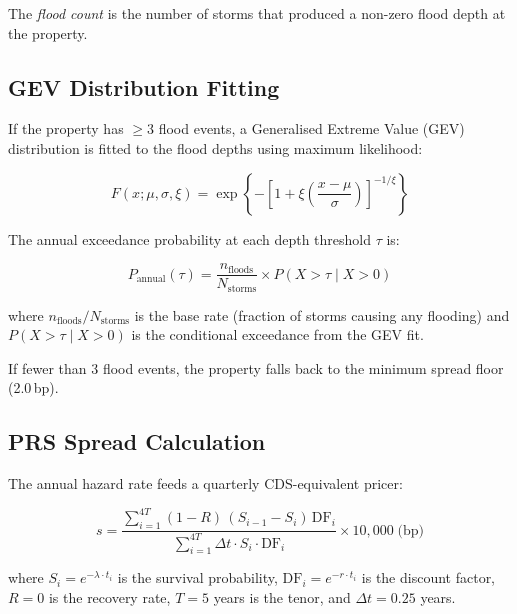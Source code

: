 \documentclass[11pt,a4paper]{article}
\begin{document}
\noindent The \emph{flood count} is the number of storms that produced a non-zero flood
depth at the property.

\subsection{GEV Distribution Fitting}

If the property has $\geq 3$ flood events, a Generalised Extreme Value (GEV)
distribution is fitted to the flood depths using maximum likelihood:

\begin{equation}
    F(x; \mu, \sigma, \xi) =
    \exp\!\left\{-\left[1 + \xi\left(\frac{x - \mu}{\sigma}\right)\right]^{-1/\xi}\right\}
\end{equation}

\noindent The annual exceedance probability at each depth threshold $\tau$ is:

\begin{equation}
    P_{\text{annual}}(\tau) = \frac{n_{\text{floods}}}{N_{\text{storms}}} \times
    P(X > \tau \mid X > 0)
    \label{eq:annual_prob}
\end{equation}

\noindent where $n_{\text{floods}} / N_{\text{storms}}$ is the base rate (fraction of
storms causing any flooding) and $P(X > \tau \mid X > 0)$ is the conditional exceedance
from the GEV fit.

If fewer than 3 flood events, the property falls back to the minimum spread floor
(2.0\,bp).

\subsection{PRS Spread Calculation}

The annual hazard rate feeds a quarterly CDS-equivalent pricer:

\begin{equation}
    s = \frac{\sum_{i=1}^{4T} (1-R)\,(S_{i-1} - S_i)\,\text{DF}_i}
             {\sum_{i=1}^{4T} \Delta t \cdot S_i \cdot \text{DF}_i}
    \times 10{,}000 \;\text{(bp)}
\end{equation}

\noindent where $S_i = e^{-\lambda \cdot t_i}$ is the survival probability, $\text{DF}_i = e^{-r \cdot t_i}$
is the discount factor, $R = 0$ is the recovery rate, $T = 5$ years is the tenor, and
$\Delta t = 0.25$ years.


\end{document}
